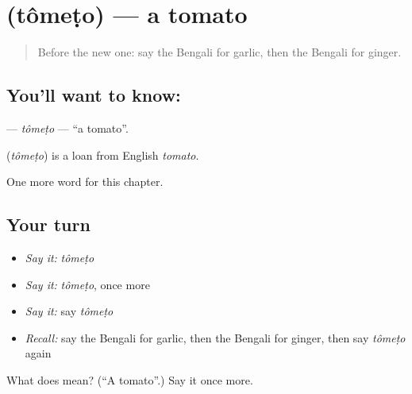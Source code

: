 \section[\texorpdfstring{\bn{টমেটো} (tômeṭo)}{টমেটো (tômeṭo)}]{ (tômeṭo) — a tomato}

\label{lesson:BN-C116-tometo}



\begin{quote}
Before the new one: say the Bengali for garlic, then the Bengali for ginger.
\end{quote}

\subsection*{You'll want to know: }
\textbf{} — \emph{tômeṭo} — \textquotedblleft{}a tomato\textquotedblright{}.

\begin{cousinweb}
\textbf{} (\emph{tômeṭo}) is a loan from English \emph{tomato}.
\end{cousinweb}

\begin{grammarlens}[title={What you've built}]
One more word for this chapter.
\end{grammarlens}

\subsection*{Your turn}
\begin{itemize}
\raggedright
  \item \emph{Say it:} \emph{tômeṭo}
  \item \emph{Say it:} \emph{tômeṭo}, once more
  \item \emph{Say it:} say \emph{tômeṭo}
  \item \emph{Recall:} say the Bengali for garlic, then the Bengali for ginger, then say \emph{tômeṭo} again
\end{itemize}

\begin{tcolorbox}[breakable,colback=teal!4,colframe=teal!35!black,title={Before you move on}]
What does  mean? (\textquotedblleft{}A tomato\textquotedblright{}.) Say it once more.
\end{tcolorbox}
